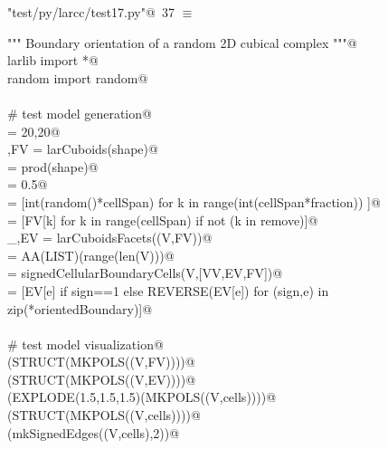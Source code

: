 \documentclass[11pt,oneside]{article}    %
\begin{document}
\begin{flushleft} \small \label{scrap59}
\protect{}\verb@"test/py/larcc/test17.py"@\nobreak\ {\footnotesize 37 }$\equiv$
\vspace{-1ex}
\begin{list}{}{} \item
\mbox{}\verb@""" Boundary orientation of a random 2D cubical complex """@\\
\mbox{}\verb@from larlib import *@\\
\mbox{}\verb@from random import random@\\
\mbox{}\verb@@\\
\mbox{}\verb@# test model generation@\\
\mbox{}\verb@shape = 20,20@\\
\mbox{}\verb@V,FV = larCuboids(shape)@\\
\mbox{}\verb@cellSpan = prod(shape)@\\
\mbox{}\verb@fraction = 0.5@\\
\mbox{}\verb@remove = [int(random()*cellSpan) for k in range(int(cellSpan*fraction)) ]@\\
\mbox{}\verb@FV = [FV[k] for k in range(cellSpan) if not (k in remove)]@\\
\mbox{}\verb@_,EV = larCuboidsFacets((V,FV))@\\
\mbox{}\verb@VV = AA(LIST)(range(len(V)))@\\
\mbox{}\verb@orientedBoundary = signedCellularBoundaryCells(V,[VV,EV,FV])@\\
\mbox{}\verb@cells = [EV[e] if sign==1 else REVERSE(EV[e]) for (sign,e) in zip(*orientedBoundary)]@\\
\mbox{}\verb@@\\
\mbox{}\verb@# test model visualization@\\
\mbox{}\verb@VIEW(STRUCT(MKPOLS((V,FV))))@\\
\mbox{}\verb@VIEW(STRUCT(MKPOLS((V,EV))))@\\
\mbox{}\verb@VIEW(EXPLODE(1.5,1.5,1.5)(MKPOLS((V,cells))))@\\
\mbox{}\verb@VIEW(STRUCT(MKPOLS((V,cells))))@\\
\mbox{}\verb@VIEW(mkSignedEdges((V,cells),2))@\\
\mbox{}\verb@@{\NWsep}
\end{list}
\vspace{-2ex}
\end{flushleft}
\end{document}
